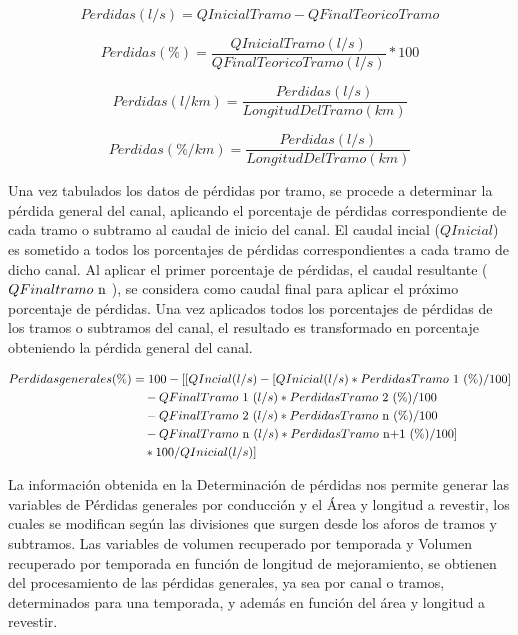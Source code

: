 \documentclass[]{article}
\begin{document}
\begin{equation}
Perdidas (l/s) = Q Inicial Tramo - Q Final Teorico Tramo 
\end{equation}

\begin{equation}
Perdidas (\%) = \frac{Q Inicial Tramo (l/s)}{ Q Final Teorico Tramo (l/s)} * 100
\end{equation}

\begin{equation}
Perdidas (l/km) = \frac{Perdidas (l/s)}{Longitud Del Tramo (km)}
\end{equation}

\begin{equation}
Perdidas (\%/km) = \frac{Perdidas (l/s)}{Longitud Del Tramo (km)}
\end{equation}

Una vez tabulados los datos de pérdidas por tramo, se procede a determinar la pérdida general del canal, aplicando el porcentaje de pérdidas correspondiente de cada tramo o subtramo al caudal de inicio del canal. El caudal incial ($QInicial$) es sometido a todos los porcentajes de pérdidas correspondientes a cada tramo de dicho canal. Al aplicar el primer porcentaje de pérdidas, el caudal resultante ($QFinaltramo \textup{ n }$), se considera como caudal final para aplicar el próximo porcentaje de pérdidas. Una vez aplicados todos los porcentajes de pérdidas de los tramos o subtramos del canal, el resultado es transformado en porcentaje obteniendo la pérdida general del canal.

\begin{equation}
 \begin{split}
	Perdidas generales(\%) & = 100-[[Q Incial (l/s) - [Q Inicial (l/s) * Perdidas Tramo \textup{ 1 } (\%)/100]\\
	&\quad - Q Final Tramo \textup{ 1 } (l/s) * Perdidas Tramo \textup{ 2 } (\%)/100\\
	&\quad - Q Final Tramo \textup{ 2 } (l/s) * Perdidas Tramo \textup{ n } (\%)/100 \\
	&\quad - Q Final Tramo \textup{ n } (l/s) * Perdidas Tramo \textup{ n+1 } (\%)/100]\\
	&\quad * 100 / Q Inicial (l/s)]
 \end{split}
\end{equation}

La información obtenida en la Determinación de pérdidas nos permite generar las variables de Pérdidas generales por conducción y el Área y longitud a revestir, los cuales se modifican según las divisiones que surgen desde los aforos de tramos y subtramos. Las variables de volumen recuperado por temporada y Volumen recuperado por temporada en función de longitud de mejoramiento, se obtienen del procesamiento de las pérdidas generales, ya sea por canal o tramos, determinados para una temporada, y además en función del área y longitud a revestir.
\end{document}
